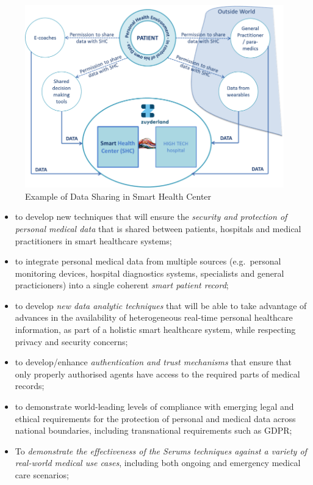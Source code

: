 \documentclass[sigconf]{acmart}
\begin{document}
\begin{figure}
  \centering
  \includegraphics[width=\columnwidth]{SmartHealthCentre.png}
  \caption{Example of Data Sharing in Smart Health Center}
  \label{fig:smartcentre}
\end{figure}
    
\begin{itemize}
\item to develop new techniques that will ensure the \emph{security and protection of personal medical data} that is shared between patients, hospitals and medical practitioners in smart healthcare systems;
\item to integrate personal medical data from multiple sources (e.g.~personal monitoring devices, hospital diagnostics systems, specialists and general practicioners) into a single coherent \emph{smart patient record};
\item to develop \emph{new data analytic techniques} that will be able to take advantage of advances in the availability of heterogeneous real-time personal healthcare information, as part of a holistic smart healthcare system, while respecting privacy and security concerns;
\item to develop/enhance \emph{authentication and trust mechanisms} that ensure that only properly authorised agents have access to the required parts of medical records;
\item to demonstrate world-leading levels of compliance with emerging legal and ethical requirements for the protection of personal and medical data across national boundaries, including transnational requirements such as GDPR;
\item To \emph{demonstrate the effectiveness of the Serums techniques against a variety of real-world medical use cases}, including both ongoing and emergency medical care scenarios;
\end{itemize}
\end{document}
